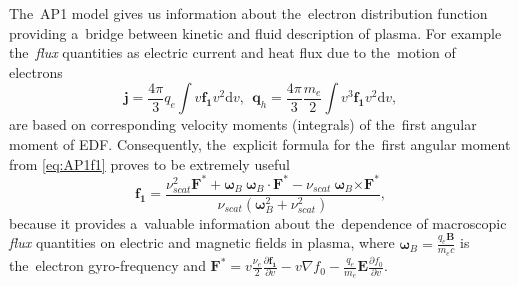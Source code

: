 \documentclass[
 aps,
 jmp,
 amsmath,amssymb,
 twocolumn,
]{revtex4-1}
\newcommand{\pdv}[2]{\frac{\partial{#1}}{\partial{#2}}}
\newcommand{\vect}[1]{\boldsymbol{#1}}
\newcommand{\dI}{\text{d}}
\newcommand{\nue}{\nu_{e}}
\newcommand{\nuscat}{\nu_{scat}}
\newcommand{\vmag}{v}
\newcommand{\E}{\vect{E}}
\newcommand{\B}{\vect{B}}
\newcommand{\omegaB}{\vect{\omega}_{B}}
\newcommand{\qe}{q_e}
\newcommand{\me}{m_e}
\newcommand{\fzero}{f_0}
\newcommand{\fone}{{\vect{f_1}}}
\begin{document}
The~AP1 model gives us information about the~electron distribution function 
providing a~bridge between kinetic and fluid description of 
plasma. For example the~\textit{flux} quantities as 
electric current and heat flux due to the~motion of electrons
\begin{equation}
  \vect{j} = \frac{4\pi}{3}\qe \int \vmag \fone \vmag^2\dI\vmag,~~ 
  \vect{q}_h = \frac{4\pi}{3}\frac{\me}{2} \int \vmag^3 \fone \vmag^2\dI\vmag,
  \nonumber
\end{equation}
are based on corresponding velocity moments (integrals) of the~first angular 
moment of EDF. Consequently, the~explicit formula for the~first angular moment
from \eqref{eq:AP1f1} 
proves to be extremely useful
\begin{equation}
  \fone = \frac{\nuscat^2 \vect{F}^* + \omegaB~\omegaB\cdot\vect{F}^* 
  - \nuscat~\omegaB \vect{\times} \vect{F}^*}{\nuscat (\omegaB^2 + \nuscat^2)}
  ,
  \label{eq:f1_explicit}
\end{equation} 
because it provides a~valuable 
information about the~dependence of macroscopic \textit{flux} quantities on
electric and magnetic fields in plasma, 
where $\omegaB = \frac{\qe\B}{\me c}$ is the~electron gyro-frequency and 
$\vect{F}^* = \vmag\frac{\nue}{2}\pdv{\fone}{\vmag} - \vmag\nabla\fzero 
 - \frac{\qe}{\me}\E\pdv{\fzero}{\vmag}$.
\end{document}
